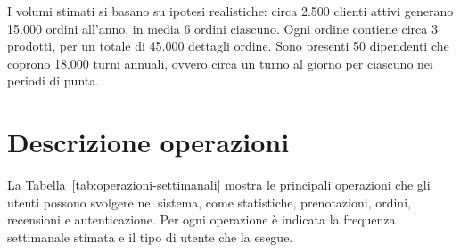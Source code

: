 \documentclass[a4paper,12pt]{report}
\begin{document}
I volumi stimati si basano su ipotesi realistiche: circa 2.500
clienti attivi generano 15.000 ordini all'anno, in media 6 ordini
ciascuno. Ogni ordine contiene circa 3 prodotti, per un totale di
45.000 dettagli ordine. Sono presenti 50 dipendenti che coprono
18.000 turni annuali, ovvero circa un turno al giorno per ciascuno
nei periodi di punta.

\section{Descrizione operazioni}
La Tabella~\ref{tab:operazioni-settimanali} mostra le principali
operazioni che gli utenti possono svolgere nel sistema, come
statistiche, prenotazioni, ordini, recensioni e autenticazione. Per
ogni operazione è indicata la frequenza settimanale stimata e il tipo
di utente che la esegue.
\end{document}

